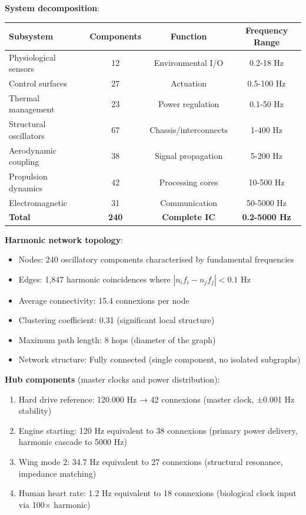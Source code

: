\documentclass{article}
\theoremstyle{definition}
\theoremstyle{remark}
\begin{document}
\textbf{System decomposition}:
\begin{center}
\begin{tabular}{lccc}
\toprule
\textbf{Subsystem} & \textbf{Components} & \textbf{Function} & \textbf{Frequency Range} \\
\midrule
Physiological sensors & 12 & Environmental I/O & 0.2-18 Hz \\
Control surfaces & 27 & Actuation & 0.5-100 Hz \\
Thermal management & 23 & Power regulation & 0.1-50 Hz \\
Structural oscillators & 67 & Chassis/interconnects & 1-400 Hz \\
Aerodynamic coupling & 38 & Signal propagation & 5-200 Hz \\
Propulsion dynamics & 42 & Processing cores & 10-500 Hz \\
Electromagnetic & 31 & Communication & 50-5000 Hz \\
\midrule
\textbf{Total} & \textbf{240} & \textbf{Complete IC} & \textbf{0.2-5000 Hz} \\
\bottomrule
\end{tabular}
\end{center}

\textbf{Harmonic network topology}:
\begin{itemize}
\item Nodes: 240 oscillatory components characterised by fundamental frequencies
\item Edges: 1,847 harmonic coincidences where $|n_i f_i - n_j f_j| < 0.1$ Hz
\item Average connectivity: 15.4 connexions per node
\item Clustering coefficient: 0.31 (significant local structure)
\item Maximum path length: 8 hops (diameter of the graph)
\item Network structure: Fully connected (single component, no isolated subgraphs)
\end{itemize}

\textbf{Hub components} (master clocks and power distribution):
\begin{enumerate}
\item Hard drive reference: 120.000 Hz → 42 connexions (master clock, ±0.001 Hz stability)
\item Engine starting: 120 Hz equivalent to 38 connexions (primary power delivery, harmonic cascade to 5000 Hz)
\item Wing mode 2: 34.7 Hz equivalent to 27 connexions (structural resonance, impedance matching)
\item Human heart rate: 1.2 Hz equivalent to 18 connexions (biological clock input via 100× harmonic)
\end{enumerate}
\end{document}
